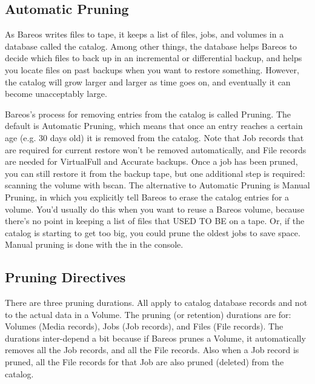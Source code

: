 \subsection{Automatic Pruning}
\label{AutoPruning}

As Bareos writes files to tape, it keeps a list of files, jobs, and volumes
in a database called the catalog.  Among other things, the database helps
Bareos to decide which files to back up in an incremental or differential
backup, and helps you locate files on past backups when you want to restore
something.  However, the catalog will grow larger and larger as time goes
on, and eventually it can become unacceptably large.

Bareos's process for removing entries from the catalog is called Pruning.  The
default is Automatic Pruning, which means that once an entry reaches a certain
age (e.g.  30 days old) it is removed from the catalog. Note that Job records
that are required for current restore won't be removed automatically, and File
records are needed for VirtualFull and Accurate backups. Once a job has been
pruned, you can still restore it from the backup tape, but one additional step
is required: scanning the volume with bscan.  The alternative to Automatic
Pruning is Manual Pruning, in which you explicitly tell Bareos to erase the
catalog entries for a volume.  You'd usually do this when you want to reuse a
Bareos volume, because there's no point in keeping a list of files that USED TO
BE on a tape.  Or, if the catalog is starting to get too big, you could prune
the oldest jobs to save space.  Manual pruning is done with the  in the console.

\subsection{Pruning Directives}

There are three pruning durations. All apply to catalog database records and
not to the actual data in a Volume. The pruning (or retention) durations are
for: Volumes (Media records), Jobs (Job records), and Files (File records).
The durations inter-depend a bit because if Bareos prunes a Volume, it
automatically removes all the Job records, and all the File records. Also when
a Job record is pruned, all the File records for that Job are also pruned
(deleted) from the catalog.

